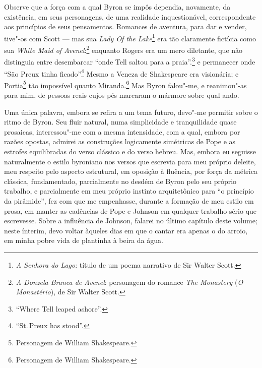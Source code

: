 Observe que a força com a qual Byron se impôs dependia, novamente, da
existência, em seus personagens, de uma realidade inquestionável,
correspondente aos princípios de seus pensamentos. Romances de aventura,
para dar e vender, tive"-os com Scott --- mas sua \textit{Lady Of the
Lake}\footnote{\textit{A Senhora do Lago}: título de um poema narrativo de
  Sir Walter Scott.} era tão claramente fictícia como sua
\textit{White Maid of Avenel}:\footnote{\textit{A Donzela Branca de Avenel}:
  personagem do romance \textit{The Monastery} (\textit{O Monastério}), de
  Sir Walter Scott.} enquanto Rogers era um mero
diletante, que não distinguia entre desembarcar ``onde Tell saltou para
a praia''.\footnote{``Where Tell leaped ashore''.} e
permanecer onde ``São Preux tinha ficado''\footnote{``St.\,Preux has
  stood''.} Mesmo a Veneza de Shakespeare era visionária;
e Portia\footnote{Personagem de William Shakespeare.} tão
impossível quanto Miranda.\footnote{Personagem de William Shakespeare.} Mas Byron falou"-me, e reanimou"-as para mim, de
pessoas reais cujos pés marcaram o mármore sobre qual ando.

Uma única palavra, embora se refira a um tema futuro, devo"-me
permitir sobre o ritmo de Byron. Seu fluir natural, numa simplicidade e
tranquilidade quase prosaicas, interessou"-me com a mesma intensidade,
com a qual, embora por razões opostas, admirei as construções
logicamente simétricas de Pope e as estrofes equilibradas do verso
clássico e do verso hebreu. Mas, embora eu seguisse naturalmente o
estilo byroniano nos versos que escrevia para meu próprio deleite, meu
respeito pelo aspecto estrutural, em oposição à fluência, por força da
métrica clássica, fundamentado, parcialmente no desdém de Byron pelo seu
próprio trabalho, e parcialmente em meu próprio instinto arquitetônico
para ``o princípio da pirâmide'', fez com que me empenhasse, durante a
formação de meu estilo em prosa, em manter as cadências de Pope e
Johnson em qualquer trabalho sério que escrevesse. Sobre a influência de
Johnson, falarei no último capítulo deste volume; neste ínterim, devo
voltar àqueles dias em que o cantar era apenas o do arroio, em minha
pobre vida de plantinha à beira da água.

